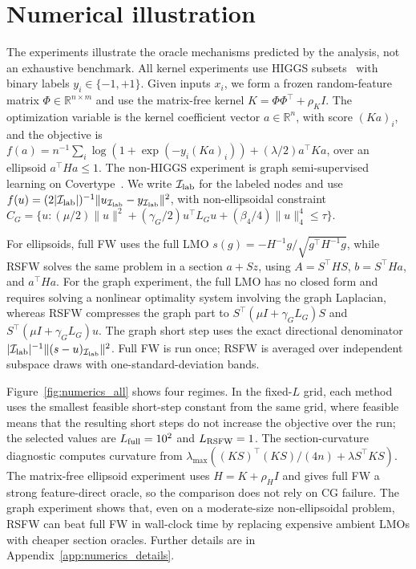 \documentclass{article}
\begin{document}
\section{Numerical illustration}
\label{sec:numerics}

The experiments illustrate the oracle mechanisms predicted by the analysis, not
an exhaustive benchmark. All kernel experiments use HIGGS subsets~\cite{BaldiSadowskiWhiteson2014HIGGS,Whiteson2014HIGGSUCI}
with binary labels \(y_i\in\{-1,+1\}\). Given inputs \(x_i\), we form a frozen
random-feature matrix \(\Phi\in\mathbb R^{n\times m}\) and use the matrix-free
kernel \(K=\Phi\Phi^\top+\rho_K I\). The optimization variable is the kernel
coefficient vector \(a\in\mathbb R^n\), with score \((Ka)_i\), and the objective is
\(f(a)=n^{-1}\sum_i\log(1+\exp(-y_i(Ka)_i))+(\lambda/2)a^\top Ka\), over an
ellipsoid \(a^\top Ha\le1\). The non-HIGGS experiment is graph semi-supervised learning on
Covertype~\cite{Blackard1998Covertype}. We write
\(\mathcal I_{\rm lab}\) for the labeled nodes and use
\(f(u)=(2|\mathcal I_{\rm lab}|)^{-1}
\|u_{\mathcal I_{\rm lab}}-y_{\mathcal I_{\rm lab}}\|^2\), with
non-ellipsoidal constraint
\(C_G=\{u:(\mu/2)\|u\|^2+(\gamma_G/2)u^\top L_Gu+(\beta_4/4)\|u\|_4^4\le\tau\}\).

For ellipsoids, full FW uses the full LMO
\(s(g)=-H^{-1}g/\sqrt{g^\top H^{-1}g}\), while RSFW solves the same problem in
a section \(a+Sz\), using \(A=S^\top HS\), \(b=S^\top Ha\), and \(a^\top Ha\).
For the graph experiment, the full LMO has no closed form and requires solving a nonlinear optimality
system involving the graph Laplacian,
whereas RSFW compresses the graph part to
\(S^\top(\mu I+\gamma_G L_G)S\) and \(S^\top(\mu I+\gamma_G L_G)u\). The graph
short step uses the exact directional denominator
\(|\mathcal I_{\rm lab}|^{-1}\|(s-u)_{\mathcal I_{\rm lab}}\|^2\). Full FW is run once; RSFW is
averaged over independent subspace draws with one-standard-deviation bands.

Figure~\ref{fig:numerics_all} shows four regimes. In the fixed-\(L\) grid, each
method uses the smallest feasible short-step constant from the same grid, where
feasible means that the resulting short steps do not increase the objective
over the run; the selected values are \(L_{\rm full}=10^2\) and
\(L_{\rm RSFW}=1\). The section-curvature diagnostic computes curvature from
\(\lambda_{\max}((KS)^\top(KS)/(4n)+\lambda S^\top KS)\). The matrix-free
ellipsoid experiment uses \(H=K+\rho_HI\) and gives full FW a strong
feature-direct oracle, so the comparison does not rely on CG failure. The graph
experiment shows that, even on a moderate-size non-ellipsoidal problem, RSFW can
beat full FW in wall-clock time by replacing expensive ambient LMOs with cheaper
section oracles. Further details are in Appendix~\ref{app:numerics_details}.
\end{document}

